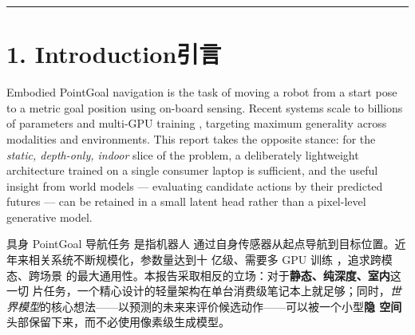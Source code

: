 \documentclass[11pt,a4paper]{article}
\providecommand{\citep}[1]{\cite{#1}}
\newcommand{\en}[1]{\par\noindent #1\par\vspace{0.15em}}
\newcommand{\zh}[1]{\par\noindent\color{zhcol}\hspace{0.5em}#1\par\color{black}\vspace{0.6em}}
\newcommand{\bisec}[2]{\section[#1]{#1\quad\normalfont\small\color{zhcol}\textsf{#2}}}
\begin{document}
\begin{abstract}
\vspace{0.6em}
\noindent\textbf{中文摘要。}\color{zhcol}
\textsf{本文提出一个用于纯深度 PointGoal 导航的\textbf{双系统架构}：
两个策略头在\textbf{共享鸟瞰图（BEV）状态}上协同工作 ——
\textbf{视觉-动作（VA）头}从 $K{=}5$ 扇形锚点候选中做快速反射式路点选择
（$\sim\!0.3$\,ms），\textbf{世界-动作（WA）头}通过 $H{=}3$ 步隐空间推演
做慢速审慎式评估，输出每步的碰撞风险、目标进度、集成方差式不确定性以及
基于 pathfinder 的可达性（$\sim\!3$\,ms）；二者通过\textbf{解析融合规则}
$Q_k = \alpha\,s_k + \beta\,p_k - \gamma\,\sigma(r_k) - \delta\,u_k -
\eta\,\sigma(d_k)$ 组合，全程不依赖端到端学习，整个模型参数量为
\textbf{1.12\,M}、推理速度约 \textbf{210\,Hz}（消费级笔记本）。在
PIB-Nav（MuJoCo 程序化基准）上闭环评测（4 种子 × 100 episode）达到
$0.49 \pm 0.05$ SR，与 A$^\star$+Safety 的理想规划上限 0.50 在\emph{统计
上不可区分}；其中来自慢速 WA-Safety 通路的
\textbf{配对跨种子 $\Delta \mathrm{SR} = +0.093 \pm 0.013$}（配对差的
标准差比单种子噪声小 $4\times$）。参数量对齐的消融显示：在 PIB-Nav 上
几何 BEV 与纯池化深度编码器在统计上不可区分（配对
$\Delta \mathrm{SR} = +0.013 \pm 0.017$，偏向 flat 但为空），我们保留
BEV 是为\emph{可解释性}与\emph{和 3D 扫描场景评估的架构一致性}。
在几何分布外的 Gibson 上，四项干预实验\textbf{量化了}架构的
\textbf{适用边界}：纯模仿式双系统无法仅靠参数调优或单轮闭环回填跨越
协方差偏移，这是一项\emph{设计边界声明}而非失败论断。}\color{black}
\end{abstract}

\noindent\rule{\textwidth}{0.4pt}

\bisec{1. Introduction}{引言}

\en{Embodied PointGoal navigation \citep{AndersonOnEvaluation2018} is the
task of moving a robot from a start pose to a metric goal position using
on-board sensing. Recent systems scale to billions of parameters and
multi-GPU training
\citep{InternNav,OmniVLA,NaVILA}, targeting maximum generality across
modalities and environments. This report takes the opposite stance: for the
\emph{static, depth-only, indoor} slice of the problem, a deliberately
lightweight architecture trained on a single consumer laptop is sufficient,
and the useful insight from world models — evaluating candidate actions by
their predicted futures — can be retained in a small latent head rather
than a pixel-level generative model.}

\zh{\textsf{具身 PointGoal 导航任务 \citep{AndersonOnEvaluation2018}是指机器人
通过自身传感器从起点导航到目标位置。近年来相关系统不断规模化，参数量达到十
亿级、需要多 GPU 训练 \citep{InternNav,OmniVLA,NaVILA}，追求跨模态、跨场景
的最大通用性。本报告采取相反的立场：对于\textbf{静态、纯深度、室内}这一切
片任务，一个精心设计的轻量架构在单台消费级笔记本上就足够；同时，\emph{世
界模型}的核心想法——以预测的未来来评价候选动作——可以被一个小型\textbf{隐
空间}头部保留下来，而不必使用像素级生成模型。}}
\end{document}

